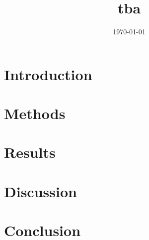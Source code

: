 \documentclass[a4paper, 11pt]{scrartcl}
\title{tba}
\author{}
\date{\today}
\begin{document}
\maketitle

\section{Introduction}


\section{Methods}


\section{Results}


\section{Discussion}


\section{Conclusion}


\newpage
\printbibliography[heading = bibintoc, title = {Bibliography}]
\end{document}

